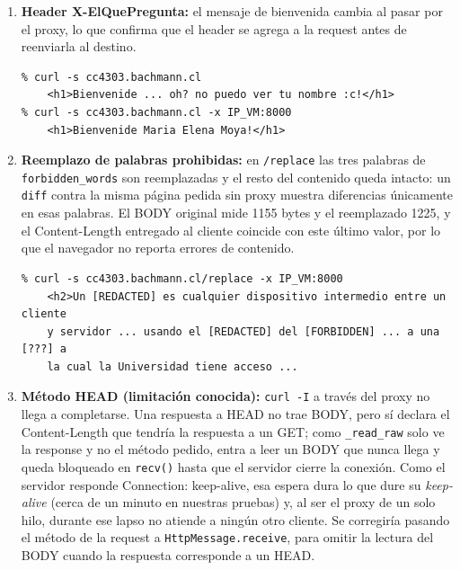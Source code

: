 \documentclass[
	spanish, %
	letterpaper, oneside
]{article}
\newcommand{\code}[1]{\texttt{#1}}    %
\newcommand{\cfgkey}[1]{\texttt{#1}}  %
\newcommand{\hdr}[1]{#1}              %
\newcommand{\status}[1]{#1}           %
\begin{document}
\begin{enumerate}
	      El segundo ciclo HTTP se verificó por separado: la petición a \code{/gato.jpg} devuelve
	      \status{200 OK} con \hdr{Content-Type} \code{image/jpeg} y los 89.818 bytes de la imagen
	      local, idénticos al archivo en disco.

	\item \textbf{Header X-ElQuePregunta:} el mensaje de bienvenida cambia al pasar por el proxy,
	      lo que confirma que el header se agrega a la request antes de reenviarla al destino.

	      \begin{verbatim}
% curl -s cc4303.bachmann.cl
    <h1>Bienvenide ... oh? no puedo ver tu nombre :c!</h1>
% curl -s cc4303.bachmann.cl -x IP_VM:8000
    <h1>Bienvenide Maria Elena Moya!</h1>
	      \end{verbatim}

	\item \textbf{Reemplazo de palabras prohibidas:} en \code{/replace} las tres palabras de
	      \cfgkey{forbidden\_words} son reemplazadas y el resto del contenido queda intacto: un
	      \code{diff} contra la misma página pedida sin proxy muestra diferencias únicamente en
	      esas palabras. El BODY original mide 1155 bytes y el reemplazado 1225, y el
	      \hdr{Content-Length} entregado al cliente coincide con este último valor, por lo que el
	      navegador no reporta errores de contenido.

	      \begin{verbatim}
% curl -s cc4303.bachmann.cl/replace -x IP_VM:8000
    <h2>Un [REDACTED] es cualquier dispositivo intermedio entre un cliente
    y servidor ... usando el [REDACTED] del [FORBIDDEN] ... a una [???] a
    la cual la Universidad tiene acceso ...
	      \end{verbatim}

	\item \textbf{Método HEAD (limitación conocida):} \code{curl -I} a través del proxy no llega a
	      completarse. Una respuesta a HEAD no trae BODY, pero sí declara el \hdr{Content-Length}
	      que tendría la respuesta a un GET; como \code{\_read\_raw} solo ve la response y no el
	      método pedido, entra a leer un BODY que nunca llega y queda bloqueado en \code{recv()}
	      hasta que el servidor cierre la conexión. Como el servidor responde
	      \hdr{Connection: keep-alive}, esa espera dura lo que dure su \textit{keep-alive}
	      (cerca de un minuto en nuestras pruebas) y, al ser el proxy de un solo hilo, durante ese
	      lapso no atiende a ningún otro cliente. Se corregiría pasando el método de la request a
	      \code{HttpMessage.receive}, para omitir la lectura del BODY cuando la respuesta
	      corresponde a un HEAD.
\end{enumerate}
\end{document}
